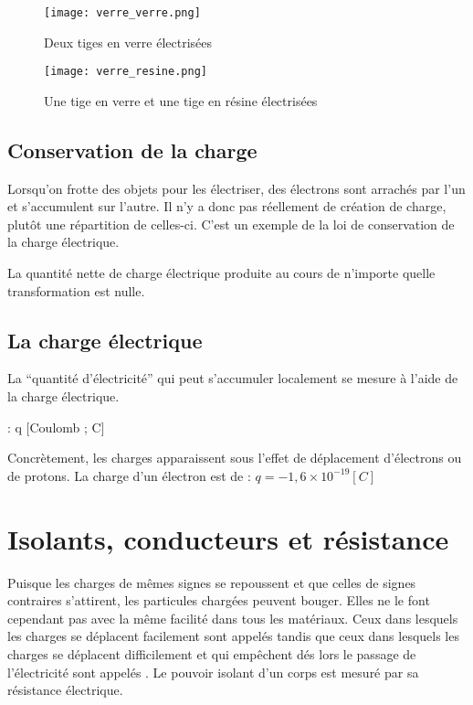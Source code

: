 \begin{figure}[!ht]
    \centering
    \begin{minipage}[b]{.47\linewidth}
        \centering
        \texttt{[image: verre\_verre.png]}
        \caption{Deux tiges en verre électrisées}
        \label{verre_verre}
    \end{minipage}
    \begin{minipage}[b]{.47\linewidth}
        \centering
        \texttt{[image: verre\_resine.png]}
        \caption{Une tige en verre et une tige en résine électrisées}
        \label{verre_resine}
    \end{minipage}
\end{figure}

\subsection{Conservation de la charge}
Lorsqu'on frotte des objets pour les électriser, des électrons sont arrachés par l'un et s'accumulent sur l'autre. Il n'y a donc pas réellement de création de charge, plutôt une répartition de celles-ci. C'est un exemple de la loi de conservation de la charge électrique.
\begin{encadre}
    La quantité nette de charge électrique produite au cours de n'importe quelle transformation est nulle.
\end{encadre}

\subsection{La charge électrique}
La \enquote{quantité d'électricité} qui peut s'accumuler localement se mesure à l'aide de la charge électrique.
\begin{encadre}
     : q [Coulomb ; C]
\end{encadre}
Concrètement, les charges apparaissent sous l'effet de déplacement d'électrons ou de protons. La charge d'un électron est de : \(q=- 1,6 \times 10^{-19}[C]\)

\section{Isolants, conducteurs et résistance}
Puisque les charges de mêmes signes se repoussent et que celles de signes contraires s'attirent, les particules chargées peuvent bouger. Elles ne le font cependant pas avec la même facilité dans tous les matériaux. Ceux dans lesquels les charges se déplacent facilement sont appelés tandis que ceux dans lesquels les charges se déplacent difficilement et qui empêchent dés lors le passage de l'électricité sont appelés . Le pouvoir isolant d'un corps est mesuré par sa résistance électrique.

